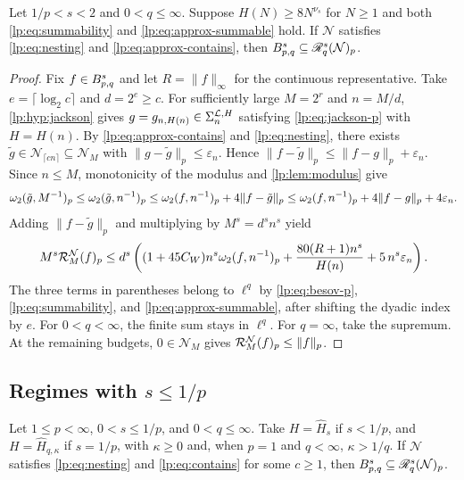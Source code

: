 \documentclass[11pt,a4paper]{article}
\begin{document}
\begin{proposicao}
\label{lp:thm:approx-transfer}
Let $1/p<s<2$ and $0<q\le\infty$. Suppose $H(N)\ge8N^{\nu_s}$ for $N\ge1$ and both \eqref{lp:eq:summability} and \eqref{lp:eq:approx-summable} hold. If $\mathcal N$ satisfies \eqref{lp:eq:nesting} and \eqref{lp:eq:approx-contains}, then $B^{s}_{p,q}\subseteq\mathscr R^{s}_{q}(\mathcal N)_p$.
\end{proposicao}

\begin{proof}
Fix $f\in B^{s}_{p,q}$ and let $R=\|f\|_\infty$ for the continuous representative. Take $e=\lceil\log_2c\rceil$ and $d=2^e\ge c$. For sufficiently large $M=2^r$ and $n=M/d$, \cref{lp:hyp:jackson} gives $g=g_{n,H(n)}\in\Sigma_{n}^{\mathcal L,H}$ satisfying \eqref{lp:eq:jackson-p} with $H=H(n)$. By \eqref{lp:eq:approx-contains} and \eqref{lp:eq:nesting}, there exists $\tilde g\in\mathcal N_{\lceil cn\rceil}\subseteq\mathcal N_M$ with $\|g-\tilde g\|_p\le\varepsilon_n$. Hence $\|f-\tilde g\|_p\le\|f-g\|_p+\varepsilon_n$. Since $n\le M$, monotonicity of the modulus and \cref{lp:lem:modulus} give
\[
 \omega_2(\tilde g,M^{-1})_{p}
 \le\omega_2(\tilde g,n^{-1})_{p}
 \le\omega_2(f,n^{-1})_{p}+4\|f-\tilde g\|_p
 \le\omega_2(f,n^{-1})_{p}+4\|f-g\|_p+4\varepsilon_n.
\]
Adding $\|f-\tilde g\|_p$ and multiplying by $M^s=d^s n^s$ yield
\[
 M^s\mathcal R^{\mathcal N}_{M}(f)_p
 \le d^s\left((1+45C_W)n^s\omega_2(f,n^{-1})_{p}+\frac{80(R+1)n^s}{H(n)}+5\,n^s\varepsilon_n\right).
\]
The three terms in parentheses belong to $\ell^q$ by \eqref{lp:eq:besov-p}, \eqref{lp:eq:summability}, and \eqref{lp:eq:approx-summable}, after shifting the dyadic index by $e$. For $0<q<\infty$, the finite sum stays in $\ell^q$. For $q=\infty$, take the supremum. At the remaining budgets, $0\in\mathcal N_M$ gives $\mathcal R^{\mathcal N}_{M}(f)_p\le\|f\|_p$.
\end{proof}

\subsection{Regimes with \texorpdfstring{$s\le1/p$}{s ≤ 1/p}}

\begin{proposicao}
\label{lp:thm:low-transfer}
Let $1\le p<\infty$, $0<s\le1/p$, and $0<q\le\infty$. Take $H=\widehat H_s$ if $s<1/p$, and $H=\widehat H_{q,\kappa}$ if $s=1/p$, with $\kappa\ge0$ and, when $p=1$ and $q<\infty$, $\kappa>1/q$. If $\mathcal N$ satisfies \eqref{lp:eq:nesting} and \eqref{lp:eq:contains} for some $c\ge1$, then $B^{s}_{p,q}\subseteq\mathscr R^{s}_{q}(\mathcal N)_p$.
\end{proposicao}
\end{document}
